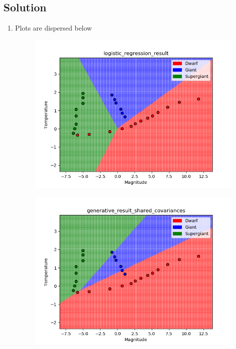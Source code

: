 \documentclass[submit]{harvardml}
\begin{document}
\subsection*{Solution}
\begin{enumerate}
    \item Plots are dispersed below
    \begin{figure} [h!]
        \centering
        \includegraphics[height=0.4\textheight]{HW2/logistic_regression_result.png}
    \end{figure}
    \begin{figure} [h!]
        \centering
        \includegraphics[height=0.4\textheight]{HW2/generative_result_shared_covariances.png}
    \end{figure}

\end{enumerate}
\end{document}
